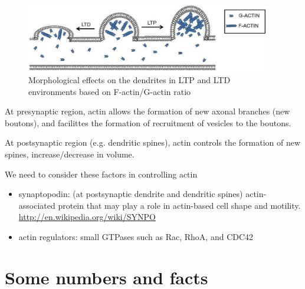 \begin{figure}[htb]
  \centerline{\includegraphics[height=3cm]{./images/F-actin_and_LTP-LTD.eps}}
  \caption{Morphological effects on the dendrites in LTP and LTD
  environments based on F-actin/G-actin ratio}
\label{fig:F-actin_and_LTP-LTD}
\end{figure}

At presynaptic region, actin allows the formation of new axonal branches
(new boutons), and facilittes the formation of recruitment of vesicles to the
boutons.

At postsynaptic region (e.g. dendritic spines), actin controls the
formation of new spines, increase/decrease in volume. 

We need to consider these factors in controlling actin
\begin{itemize}
  \item synaptopodin: (at postsynaptic dendrite and dendritic spines)
  actin-associated protein that may play a role in actin-based cell shape and
  motility.
  \url{http://en.wikipedia.org/wiki/SYNPO}
  
  \item actin regulators: small GTPases such as Rac, RhoA, and CDC42
  
\end{itemize}
 

\section{Some numbers and facts}
\label{sec:some-numbers}

